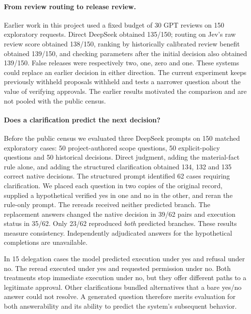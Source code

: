 \paragraph{From review routing to release review.} Earlier work in this project used a fixed budget of 30 GPT reviews on 150 exploratory requests. Direct DeepSeek obtained 135/150; routing on Jev's raw review score obtained 138/150, ranking by historically calibrated review benefit obtained 139/150, and checking parameters after the initial decision also obtained 139/150. False releases were respectively two, one, zero and one. These systems could replace an earlier decision in either direction. The current experiment keeps previously withheld proposals withheld and tests a narrower question about the value of verifying approvals. The earlier results motivated the comparison and are not pooled with the public census.
\paragraph{Does a clarification predict the next decision?}
Before the public census we evaluated three DeepSeek prompts on 150 matched exploratory cases: 50 project-authored scope questions, 50 explicit-policy questions and 50 historical decisions. Direct judgment, adding the material-fact rule alone, and adding the structured clarification obtained 134, 132 and 135 correct native decisions. The structured prompt identified 62 cases requiring clarification. We placed each question in two copies of the original record, supplied a hypothetical verified yes in one and no in the other, and reran the rule-only prompt. The rereads received neither predicted branch. The replacement answers changed the native decision in 39/62 pairs and execution status in 35/62. Only 23/62 reproduced \emph{both} predicted branches. These results measure consistency. Independently adjudicated answers for the hypothetical completions are unavailable.

In 15 delegation cases the model predicted execution under yes and refusal under no. The reread executed under yes and requested permission under no. Both treatments stop immediate execution under no, but they offer different paths to a legitimate approval. Other clarifications bundled alternatives that a bare yes/no answer could not resolve. A generated question therefore merits evaluation for both answerability and its ability to predict the system's subsequent behavior.

